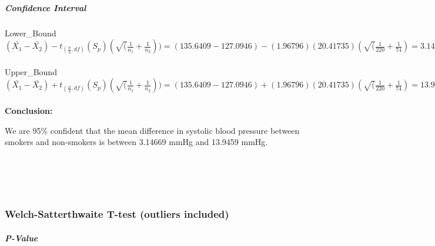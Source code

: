 \documentclass[
]{article}
\begin{document}
\hypertarget{confidence-interval-1}{%
\subparagraph{\texorpdfstring{\textbf{Confidence
Interval}}{Confidence Interval}}\label{confidence-interval-1}}

\hfill\break
Lower\_Bound\\
\((\bar{X_{1}}-\bar{X_{2}}) - t_{(\frac{\alpha}{2},df)}(S_{p})(\sqrt(\frac{1}{n_{1}}+\frac{1}{n_{2}})) = (135.6409 - 127.0946) - (1.96796)(20.41735)(\sqrt(\frac{1}{220}+\frac{1}{74}) = 3.14669\)\\
~\\
Upper\_Bound\\
\((\bar{X_{1}}-\bar{X_{2}}) + t_{(\frac{\alpha}{2},df)}(S_{p})(\sqrt(\frac{1}{n_{1}}+\frac{1}{n_{2}})) = (135.6409 - 127.0946) + (1.96796)(20.41735)(\sqrt(\frac{1}{220}+\frac{1}{74}) = 13.9459\)\\
~\\

\textbf{Conclusion:}

We are 95\% confident that the mean difference in systolic blood
pressure between smokers and non-smokers is between 3.14669 mmHg and
13.9459 mmHg.\\
~\\
~\\
~\\
~\\

\hypertarget{welch-satterthwaite-t-test-outliers-included}{%
\subsubsection{Welch-Satterthwaite T-test (outliers
included)}\label{welch-satterthwaite-t-test-outliers-included}}

\hypertarget{p-value-2}{%
\subparagraph{\texorpdfstring{\textbf{P-Value}}{P-Value}}\label{p-value-2}}
\end{document}
